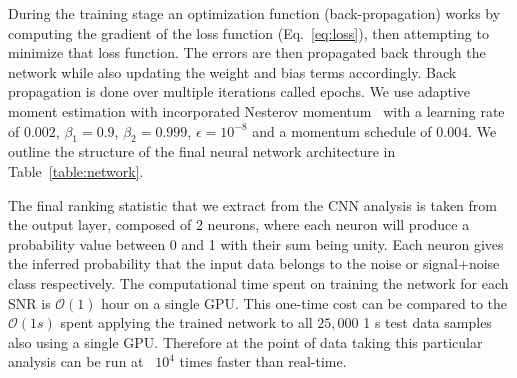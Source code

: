 \documentclass[%
showpacs,
 amsmath,amssymb,
 aps,
 twocolumn,
 prl,
 reprint,
floatfix,
]{revtex4-1}
\begin{document}
%
%

%
%
During the training stage an optimization function (back-propagation) works by
computing the gradient of the loss function (Eq.~\ref{eq:loss}), then
attempting to minimize that loss function. The errors are then propagated back
through the network while also updating the weight and bias terms
accordingly.  Back propagation is done over multiple iterations called epochs.
We use adaptive moment estimation with incorporated Nesterov
momentum~\cite{dozat2016incorporating} with a learning rate of $0.002$,
$\beta_{1}=0.9$, $\beta_{2}=0.999$, $\epsilon = 10^{-8}$ and a momentum
schedule of $0.004$. We outline the structure of the final neural network
architecture in Table~\ref{table:network}.



%
%
The final ranking statistic that we extract from the \ac{CNN} analysis is taken
from the output layer, composed of 2 neurons, where each neuron will
produce a probability value between 0 and 1 with their sum being unity. Each
neuron gives the inferred probability that the input data belongs to the noise
or signal+noise class respectively. The computational time spent on training the network for each SNR is $\mathcal{O}(1)$ hour
on a single GPU. This one-time cost can be compared to the $\mathcal{O}(1 s)$ spent
applying the trained network to all $25,000$ 1 s test data samples also using a
single GPU. Therefore at the point of data taking this particular analysis can
be run at ~$10^{4}$ times faster than real-time.
\end{document}

